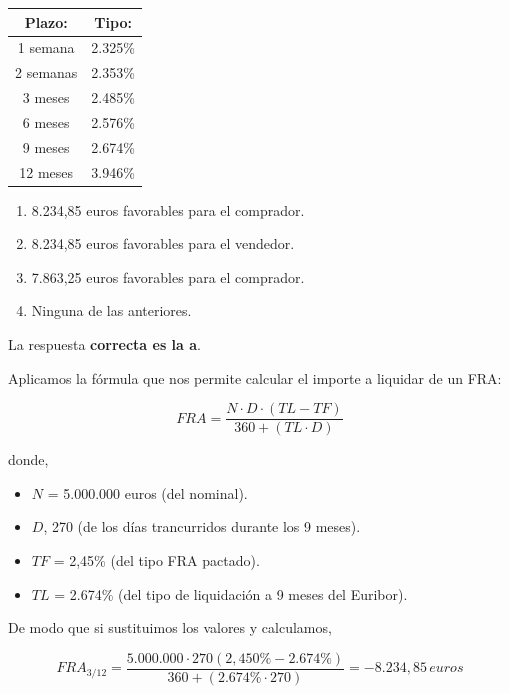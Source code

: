 \documentclass[
  letterpaper,
  DIV=11,
  numbers=noendperiod]{scrreprt}
\begin{document}
\begin{longtable}[]{@{}cc@{}}
\toprule()
\textbf{Plazo:} & \textbf{Tipo:} \\
\midrule()
\endhead
1 semana & 2.325\% \\
2 semanas & 2.353\% \\
3 meses & 2.485\% \\
6 meses & 2.576\% \\
9 meses & 2.674\% \\
12 meses & 3.946\% \\
\bottomrule()
\end{longtable}

\begin{enumerate}
\def\labelenumi{\alph{enumi}.}
\item
  8.234,85 euros favorables para el comprador.
\item
  8.234,85 euros favorables para el vendedor.
\item
  7.863,25 euros favorables para el comprador.
\item
  Ninguna de las anteriores.
\end{enumerate}

\begin{tcolorbox}[enhanced jigsaw, left=2mm, opacityback=0, colback=white, breakable, arc=.35mm, bottomrule=.15mm, rightrule=.15mm, toprule=.15mm, leftrule=.75mm, colframe=quarto-callout-tip-color-frame]
\begin{minipage}[t]{5.5mm}
\textcolor{quarto-callout-tip-color}{\faLightbulb}
\end{minipage}%
\begin{minipage}[t]{\textwidth - 5.5mm}

La respuesta \textbf{correcta es la a}.

Aplicamos la fórmula que nos permite calcular el importe a liquidar de
un FRA:

\[FRA=\frac{N\cdot D\cdot \left(TL-TF\right)}{360+\left(TL\cdot D\right)}\]

donde,

\begin{itemize}
\item
  \(N\) = 5.000.000 euros (del nominal).
\item
  \(D\), 270 (de los días trancurridos durante los 9 meses).
\item
  \(TF\) = 2,45\% (del tipo FRA pactado).
\item
  \(TL\) = 2.674\% (del tipo de liquidación a 9 meses del Euribor).
\end{itemize}

De modo que si sustituimos los valores y calculamos,

\[FRA_{3/12}=\frac{5.000.000\cdot270\left(2,450\%-2.674\%\right)}{360+\left(2.674\%\cdot 270\right)}=-8.234,85\,euros\]

\end{minipage}%
\end{tcolorbox}
\end{document}
